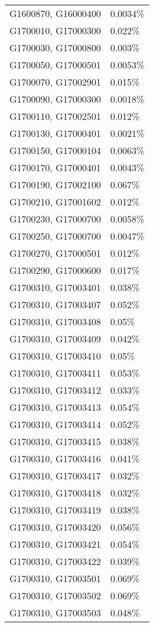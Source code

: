 \begin{longtable}[]{@{}ll@{}}
G1600870, G16000400 & 0.0034\% \\
G1700010, G17000300 & 0.022\% \\
G1700030, G17000800 & 0.003\% \\
G1700050, G17000501 & 0.0053\% \\
G1700070, G17002901 & 0.015\% \\
G1700090, G17000300 & 0.0018\% \\
G1700110, G17002501 & 0.012\% \\
G1700130, G17000401 & 0.0021\% \\
G1700150, G17000104 & 0.0063\% \\
G1700170, G17000401 & 0.0043\% \\
G1700190, G17002100 & 0.067\% \\
G1700210, G17001602 & 0.012\% \\
G1700230, G17000700 & 0.0058\% \\
G1700250, G17000700 & 0.0047\% \\
G1700270, G17000501 & 0.012\% \\
G1700290, G17000600 & 0.017\% \\
G1700310, G17003401 & 0.038\% \\
G1700310, G17003407 & 0.052\% \\
G1700310, G17003408 & 0.05\% \\
G1700310, G17003409 & 0.042\% \\
G1700310, G17003410 & 0.05\% \\
G1700310, G17003411 & 0.053\% \\
G1700310, G17003412 & 0.033\% \\
G1700310, G17003413 & 0.054\% \\
G1700310, G17003414 & 0.052\% \\
G1700310, G17003415 & 0.038\% \\
G1700310, G17003416 & 0.041\% \\
G1700310, G17003417 & 0.032\% \\
G1700310, G17003418 & 0.032\% \\
G1700310, G17003419 & 0.038\% \\
G1700310, G17003420 & 0.056\% \\
G1700310, G17003421 & 0.054\% \\
G1700310, G17003422 & 0.039\% \\
G1700310, G17003501 & 0.069\% \\
G1700310, G17003502 & 0.069\% \\
G1700310, G17003503 & 0.048\% \\

\end{longtable}
